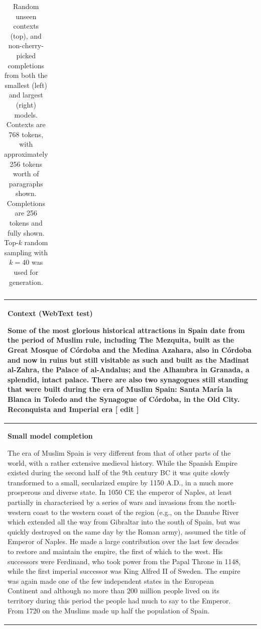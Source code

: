 \documentclass{article}
\begin{document}
\begin{table}[t]
\begin{center}
\begin{tabular}{|p{8cm}|p{8cm}|}
\end{tabular}
\caption{Random unseen contexts (top), and non-cherry-picked completions from both the smallest (left) and largest (right) models. Contexts are 768 tokens, with approximately 256 tokens worth of paragraphs shown.  Completions are 256 tokens and fully shown.
Top-$k$ random sampling with $k = 40$ was used for generation.}
\label{samplescompare1}
\end{center}
\end{table}

\begin{table}[t]
\begin{center}
\begin{tabular}{|p{8cm}|p{8cm}|}

\hline
\multicolumn{2}{|C{16cm}|}{
\centerline{\textbf{Context (WebText test)}}
Some of the most glorious historical attractions in Spain date from the period of Muslim rule, including The Mezquita, built as the Great Mosque of Córdoba and the Medina Azahara, also in Córdoba and now in ruins but still visitable as such and built as the Madinat al-Zahra, the Palace of al-Andalus; and the Alhambra in Granada, a splendid, intact palace. There are also two synagogues still standing that were built during the era of Muslim Spain: Santa María la Blanca in Toledo and the Synagogue of Córdoba, in the Old City.
\newline\newline
Reconquista and Imperial era [ edit ]
} \\
\hline
\centerline{\textbf{Small model completion}}
\phantom \newline\newline The era of Muslim Spain is very different from that of other parts of the world, with a rather extensive medieval history. While the Spanish Empire existed during the second half of the 9th century BC it was quite slowly transformed to a small, secularized empire by 1150 A.D., in a much more prosperous and diverse state. In 1050 CE the emperor of Naples, at least partially in characterised by a series of wars and invasions from the north-western coast to the western coast of the region (e.g., on the Danube River which extended all the way from Gibraltar into the south of Spain, but was quickly destroyed on the same day by the Roman army), assumed the title of Emperor of Naples. He made a large contribution over the last few decades to restore and maintain the empire, the first of which to the west. His successors were Ferdinand, who took power from the Papal Throne in 1148, while the first imperial successor was King Alfred II of Sweden. The empire was again made one of the few independent states in the European Continent and although no more than 200 million people lived on its territory during this period the people had much to say to the Emperor. From 1720 on the Muslims made up half the population of Spain.


\end{tabular}
\end{center}
\end{table}
\end{document}
